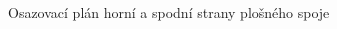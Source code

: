 \documentclass[12pt,a4paper,oneside]{article}
\begin{document}
\begin{figure} [h!tbp]
  \caption{Osazovací plán horní a spodní strany plošného spoje}
  \label{fig:osazovaci_plan}
\end{figure}

\begin{thebibliography}{99}

\end{thebibliography}
\end{document}
